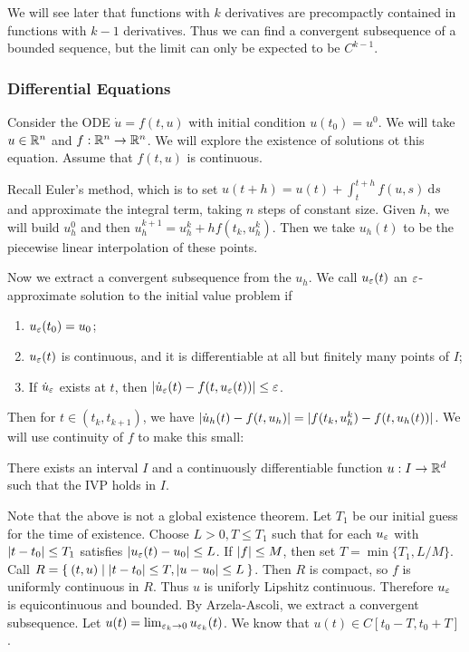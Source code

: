 \documentclass[10pt, twoside]{article}
\renewcommand{\d}{\ \mathrm{d}}
\begin{document}
    \begin{rmk} We will see later that functions with $k$ derivatives are
        precompactly contained in functions with $k-1$ derivatives. Thus we can
        find a convergent subsequence of a bounded sequence, but the limit can
        only be expected to be $C^{k-1}$.  \end{rmk}

    \subsubsection{Differential Equations}

    \begin{exm} Consider the ODE $\dot{u} =f(t,u)$
        with initial condition $u(t_0) = u^0$. We will take $u \in \mathbb{R}^n$ and
        $f: \mathbb{R}^n \rightarrow \mathbb{R}^n$. We will explore the existence of solutions
        ot this equation. Assume that $f(t,u)$ is continuous.

        Recall Euler's method, which is to set $u(t+h) = u(t) + \int_t^{t+h}
        f(u,s) \d s$ and approximate the integral term, taking $n$ steps of
        constant size. Given $h$, we will build $u_h^0$ and then $u_h^{k+1} =
        u_h^k + hf(t_k, u_h^k)$. Then we take $u_h(t)$ to be the piecewise
        linear interpolation of these points.

        Now we extract a convergent subsequence from the $u_h$. We call
        $u_{\varepsilon}(t)$ an $\varepsilon$-approximate solution to the initial value problem
        if \begin{enumerate} \item $u_{\varepsilon}(t_0) = u_0$; \item $u_{\varepsilon}(t)$ is
            continuous, and it is differentiable at all but finitely many
            points of $I$; \item If $\dot{u}_{\varepsilon}$ exists at $t$, then
    $\lvert\dot{u}_{\varepsilon}(t) - f(t, u_{\varepsilon}(t))\rvert \leq \varepsilon$.  \end{enumerate}

        Then for $t \in (t_k, t_{k+1})$, we have $\lvert\dot{u}_h(t) - f(t,u_h)\rvert
        = \lvert f(t_k, u_h^k) - f(t, u_h(t))\rvert$. We will use continuity of $f$ to
        make this small: \begin{thm} There exists an interval $I$ and a
            continuously differentiable function $u:I \rightarrow \mathbb{R}^d$ such
            that the IVP holds in $I$.  \end{thm}

        Note that the above is not a global existence theorem. Let $T_1$ be our
        initial guess for the time of existence. Choose $L > 0, T \leq T_1$
        such that for each $u_{\varepsilon}$ with $\lvert t-t_0\rvert \leq T_1$ satisfies
        $\lvert u_{\varepsilon}(t) - u_0\rvert \leq L$. If $\lvert f\rvert \leq M$, then set $T =
        \min\{T_1, L/M\}$. Call $R = \Set{(t,u) | \lvert t-t_0\rvert \leq T,
        \lvert u-u_0\rvert \leq L}$. Then $R$ is compact, so $f$ is uniformly
        continuous in $R$. Thus $u$ is uniforly Lipshitz continuous. Therefore
        $u_{\varepsilon}$ is equicontinuous and bounded. By Arzela-Ascoli, we extract a
        convergent subsequence. Let $u(t) = \lim_{\varepsilon_k \rightarrow 0}
        u_{\varepsilon_k}(t)$. We know that $u(t) \in C[t_0-T, t_0+T]$. 


\end{exm}
\end{document}

